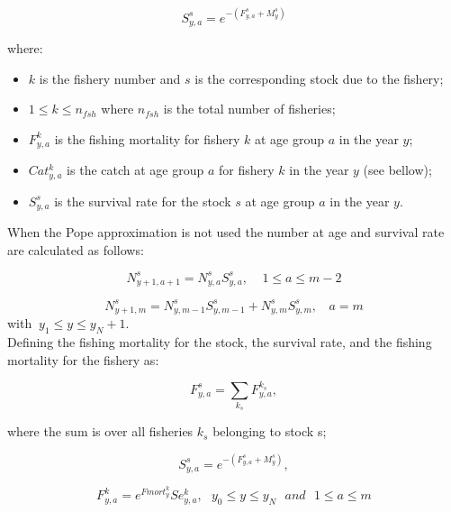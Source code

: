 \documentclass{article}
\begin{document}
\begin{equation}
S^s_{y,a}=e^{-(F^s_{y,a}+M^s_{y})}
\end{equation}

where:
\begin{itemize}
    \item $k$ is the fishery number and $s$ is the corresponding stock due to the fishery;
    
    \item $1\leq k \leq n_{fsh}$ where $n_{fsh}$ is the total number of fisheries;
   
    \item $F^k_{y,a}$ is the fishing mortality for fishery $k$ at age group $a$ in the year $y$;

    \item $Cat^k_{y,a}$ is the catch at age group $a$ for fishery $k$ in the year $y$ (see bellow);
    
    \item $S^s_{y,a}$ is the survival rate for the stock $s$ at age group $a$ in the year $y$.
\end{itemize}

\hfill

When the Pope approximation is not used the number at age and survival rate are calculated as follows:

\begin{equation}
N^s_{y+1,a+1}=N^s_{y,a}S^s_{y,a}, \ \ \ \ \ 1\leq a \leq m-2
\end{equation}

\begin{equation}
N^s_{y+1,m}=N^s_{y,m-1}S^s_{y,m-1}+N^s_{y,m}S^s_{y,m}, \ \ \ \ a = m
\end{equation}
with $\ y_1\leq y \leq y_N+1$.\\

Defining the fishing mortality for the stock, the survival rate, and the fishing mortality for the fishery as:

\begin{equation}
F^s_{y,a} = \sum_{k_s}F^{k_s}_{y,a}, 
\end{equation}

where the sum is over all fisheries $k_s$ belonging to stock s;

\begin{equation}
S^s_{y,a}=e^{-(F^s_{y,a}+M^{s}_{y})},
\end{equation}

\begin{equation}
F^k_{y,a}=e^{Fmort^k_y}Se^k_{y,a}, \ \ \ y_0\leq y \leq y_N \ \ \ and  \ \ \  1\leq a \leq m
\end{equation}
\end{document}
